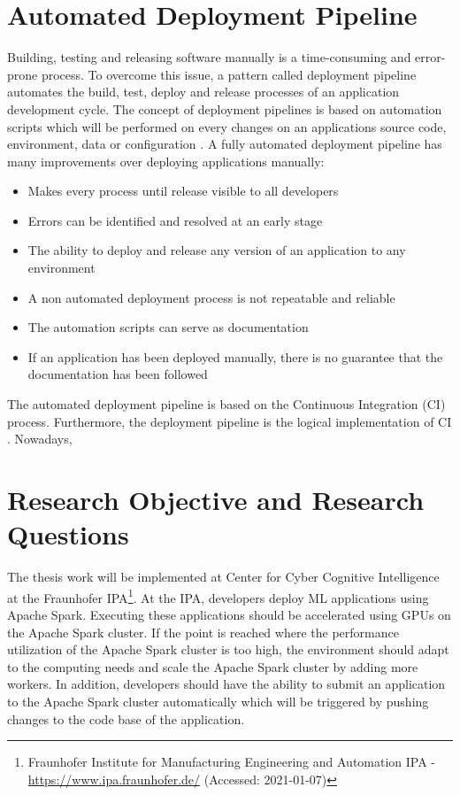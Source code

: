 \section{Automated Deployment Pipeline}
Building, testing and releasing software manually is a time-consuming and error-prone process.
To overcome this issue, a pattern called deployment pipeline automates the build, test, deploy and release processes of an application development cycle.
The concept of deployment pipelines is based on automation scripts which will be performed on every changes on an applications source code, environment, data or configuration \cite{Farley2010CI}.
A fully automated deployment pipeline has many improvements over deploying applications manually:
\begin{itemize}
\item Makes every process until release visible to all developers \cite{Farley2010CI}
\item Errors can be identified and resolved at an early stage \cite{Farley2010CI}
\item The ability to deploy and release any version of an application to any environment \cite{Farley2010CI}
\item A non automated deployment process is not repeatable and reliable \cite{Farley2010CI}
\item The automation scripts can serve as documentation \cite{Farley2010CI}
\item If an application has been deployed manually, there is no guarantee that the documentation has been followed \cite{Farley2010CI}
\end{itemize}
The automated deployment pipeline is based on the Continuous Integration (CI) process. Furthermore, the deployment pipeline is the logical implementation of CI \cite{Farley2010CI}.
Nowadays, 


\section{Research Objective and Research Questions}
The thesis work will be implemented at Center for Cyber Cognitive Intelligence at the Fraunhofer IPA\footnote{Fraunhofer Institute for Manufacturing Engineering and Automation IPA - \url{https://www.ipa.fraunhofer.de/} (Accessed: 2021-01-07)}.
At the IPA, developers deploy ML applications using Apache Spark.
Executing these applications should be accelerated using GPUs on the Apache Spark cluster.
If the point is reached where the performance utilization of the Apache Spark cluster is too high, the environment should adapt to the computing needs and scale the Apache Spark cluster by adding more workers.
In addition, developers should have the ability to submit an application to the Apache Spark cluster automatically which will be triggered by pushing changes to the code base of the application.


